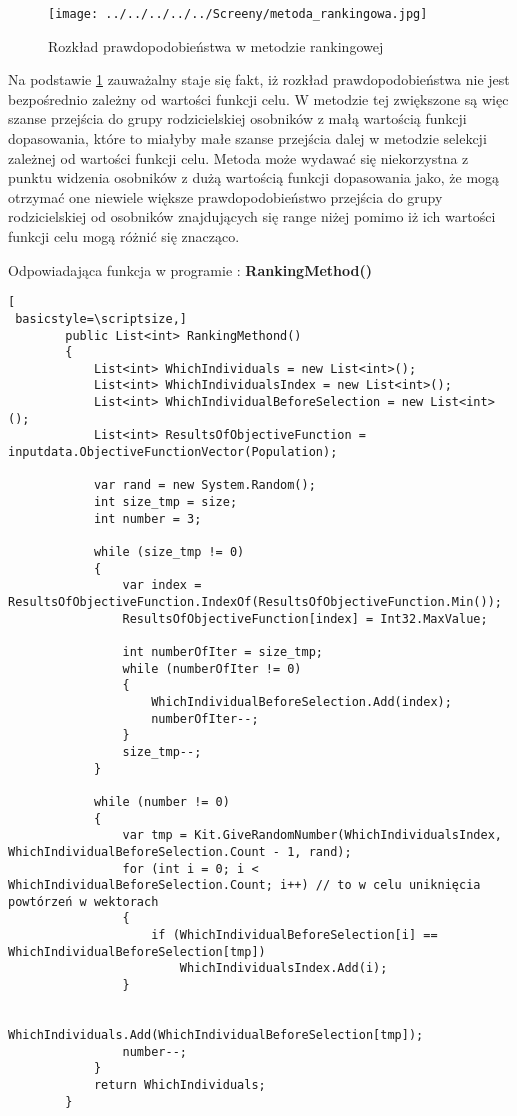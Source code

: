 \begin{figure}[h]
		\texttt{[image: ../../../../../Screeny/metoda\_rankingowa.jpg]}
		\caption{Rozkład prawdopodobieństwa w metodzie rankingowej}
		\label{ranking}			
\end{figure}
\par
Na podstawie \ref{ranking} zauważalny staje się fakt, iż rozkład prawdopodobieństwa nie jest bezpośrednio zależny od wartości funkcji celu. W metodzie tej zwiększone są więc szanse przejścia do grupy rodzicielskiej osobników z małą wartością funkcji dopasowania, które to miałyby małe szanse przejścia dalej w metodzie selekcji zależnej od wartości funkcji celu. Metoda może wydawać się niekorzystna z punktu widzenia osobników z dużą wartością funkcji dopasowania jako, że mogą otrzymać one niewiele większe prawdopodobieństwo przejścia do grupy rodzicielskiej od osobników znajdujących się range niżej pomimo iż ich wartości funkcji celu mogą różnić się znacząco.
\par
\vspace{0,4cm}
Odpowiadająca funkcja w programie : \textbf{RankingMethod()}
\begin{program}
\begin{lstlisting}[
 basicstyle=\scriptsize,]
        public List<int> RankingMethond()
        {
            List<int> WhichIndividuals = new List<int>();
            List<int> WhichIndividualsIndex = new List<int>();
            List<int> WhichIndividualBeforeSelection = new List<int>();
            List<int> ResultsOfObjectiveFunction = inputdata.ObjectiveFunctionVector(Population);

            var rand = new System.Random();
            int size_tmp = size;
            int number = 3;

            while (size_tmp != 0)
            {
                var index = ResultsOfObjectiveFunction.IndexOf(ResultsOfObjectiveFunction.Min());
                ResultsOfObjectiveFunction[index] = Int32.MaxValue;

                int numberOfIter = size_tmp;
                while (numberOfIter != 0)
                {
                    WhichIndividualBeforeSelection.Add(index);
                    numberOfIter--;
                }
                size_tmp--;
            }

            while (number != 0)
            {
                var tmp = Kit.GiveRandomNumber(WhichIndividualsIndex, WhichIndividualBeforeSelection.Count - 1, rand);
                for (int i = 0; i < WhichIndividualBeforeSelection.Count; i++) // to w celu uniknięcia powtórzeń w wektorach
                {
                    if (WhichIndividualBeforeSelection[i] == WhichIndividualBeforeSelection[tmp])
                        WhichIndividualsIndex.Add(i);
                }

                WhichIndividuals.Add(WhichIndividualBeforeSelection[tmp]);
                number--;
            }
            return WhichIndividuals;
        }
\end{lstlisting}
\end{program}

